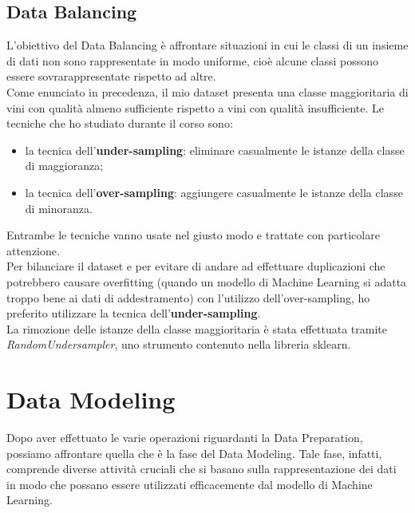 \documentclass{article}
\begin{document}
\begin{titlepage}
        \subsection{Data Balancing}
         L'obiettivo del Data Balancing è affrontare situazioni in cui le classi di un insieme di dati non sono rappresentate in modo uniforme, cioè alcune classi possono essere sovrarappresentate rispetto ad altre.\\
        Come enunciato in precedenza, il mio dataset presenta una classe maggioritaria di vini con qualità almeno sufficiente rispetto a vini con qualità insufficiente. Le tecniche che ho studiato durante il corso sono:
        \begin{itemize}
            \item la tecnica dell'\textbf{under-sampling}: eliminare casualmente le istanze della classe di maggioranza;
            \item la tecnica dell'\textbf{over-sampling}: aggiungere casualmente le istanze della classe di minoranza.
        \end{itemize}
        Entrambe le tecniche vanno usate nel giusto modo e trattate con particolare attenzione.\\ Per bilanciare il dataset e per evitare di andare ad effettuare duplicazioni che potrebbero causare overfitting (quando un modello di Machine Learning si adatta troppo bene ai dati di addestramento) con l'utilizzo dell'over-sampling, ho preferito utilizzare la tecnica dell'\textbf{under-sampling}. \\ La rimozione delle istanze della classe maggioritaria è stata effettuata tramite \textit{RandomUndersampler}, uno strumento contenuto nella libreria sklearn.
        \newpage
        \section{Data Modeling}
        Dopo aver effettuato le varie operazioni riguardanti la Data Preparation, possiamo affrontare quella che è la fase del Data Modeling. Tale fase, infatti, comprende diverse attività cruciali che si basano sulla rappresentazione dei dati in modo che possano essere utilizzati efficacemente dal modello di Machine Learning.

\end{titlepage}
\end{document}
